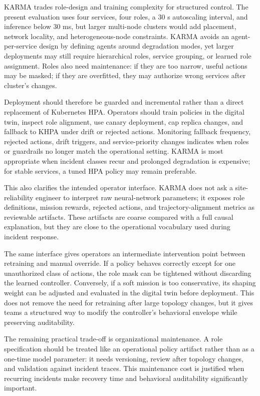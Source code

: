 \documentclass[journal]{IEEEtran}
\begin{document}
KARMA trades role-design and training complexity for structured control. The present evaluation uses four services, four roles, a 30 s autoscaling interval, and inference below 30 ms, but larger multi-node clusters would add placement, network locality, and heterogeneous-node constraints. KARMA avoids an agent-per-service design by defining agents around degradation modes, yet larger deployments may still require hierarchical roles, service grouping, or learned role assignment. Roles also need maintenance: if they are too narrow, useful actions may be masked; if they are overfitted, they may authorize wrong services after cluster's changes.

Deployment should therefore be guarded and incremental rather than a direct replacement of Kubernetes HPA. Operators should train policies in the digital twin, inspect role alignment, use canary deployment, cap replica changes, and fallback to KHPA under drift or rejected actions. Monitoring fallback frequency, rejected actions, drift triggers, and service-priority changes indicates when roles or guardrails no longer match the operational setting. KARMA is most appropriate when incident classes recur and prolonged degradation is expensive; for stable services, a tuned HPA policy may remain preferable.

This also clarifies the intended operator interface. KARMA does not ask a site-reliability engineer to interpret raw neural-network parameters; it exposes role definitions, mission rewards, rejected actions, and trajectory-alignment metrics as reviewable artifacts. These artifacts are coarse compared with a full causal explanation, but they are close to the operational vocabulary used during incident response.

The same interface gives operators an intermediate intervention point between retraining and manual override. If a policy behaves correctly except for one unauthorized class of actions, the role mask can be tightened without discarding the learned controller. Conversely, if a soft mission is too conservative, its shaping weight can be adjusted and evaluated in the digital twin before deployment. This does not remove the need for retraining after large topology changes, but it gives teams a structured way to modify the controller's behavioral envelope while preserving auditability.

The remaining practical trade-off is organizational maintenance. A role specification should be treated like an operational policy artifact rather than as a one-time model parameter: it needs versioning, review after topology changes, and validation against incident traces. This maintenance cost is justified when recurring incidents make recovery time and behavioral auditability significantly important.
\end{document}
